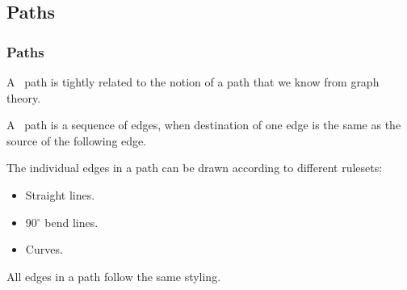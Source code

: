 \subsection{Paths}
\begin{frame}[fragile]
  \frametitle{Paths}
  \vspace{3mm}
  A \TikZ\ path is tightly related to the notion of a path that we know from graph theory.
  
  \pause
  \vspace{5mm}
  A \TikZ\ path is a sequence of edges, when destination of one edge is the same as the source of the following edge.
  
  \vspace{5mm}
  The individual edges in a path can be drawn according to different rulesets:
  \begin{itemize}
    \item Straight lines.
    \item 90$^\circ$ bend lines.
    \item Curves.
  \end{itemize}
  
  \vspace{5mm}
  All edges in a path follow the same styling.
\end{frame}

